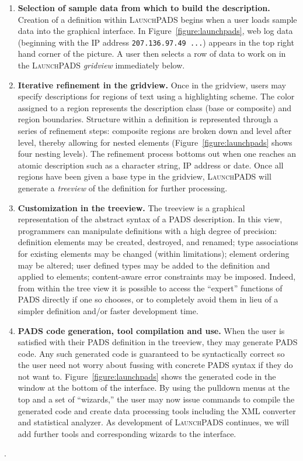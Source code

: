 \documentclass[nocopyrightspace]{sigplanconf}
\begin{document}
\begin{enumerate}
\item {\bf Selection of sample data from which to build the description.} 
Creation of a definition within \textsc{LaunchPADS} begins
when a user loads sample data into the graphical interface.
In Figure~\ref{figure:launchpads}, web log data (beginning with
the IP address {\tt 207.136.97.49 ...}) appears
in the top right hand corner of the picture.  A user then
selects a row of data to work on in the \textsc{LaunchPADS} {\it gridview}
immediately below.

\item {\bf Iterative refinement in the gridview.}
Once in the gridview, users may specify descriptions 
for regions of text using a highlighting scheme.  The 
color assigned to a region
represents the description class (base or composite) and region boundaries.  
Structure within a definition is represented through a series of
refinement steps: composite regions are broken down and level after 
level, thereby allowing for nested elements (Figure~\ref{figure:launchpads}
shows four nesting levels).  The refinement process bottoms out
when one reaches an atomic description such as a character string,
IP address or date.  Once all regions have
been given a base type in the gridview,  \textsc{LaunchPADS} will generate a
{\it treeview} of the definition for further processing.

\item {\bf Customization in the treeview.}  The treeview is
a graphical representation of the abstract syntax of a PADS description.
In this view, programmers can manipulate definitions with a high degree
of precision: definition elements may be created, destroyed, and
renamed; type associations for existing elements may be changed
(within limitations); element ordering may be altered; user defined
types may be added to the definition and applied to elements;
content-aware error constraints may be imposed.  Indeed, from within
the tree view it is possible to access the ``expert'' functions of
\textsc{PADS} directly if one so chooses, or to completely avoid them
in lieu of a simpler definition and/or faster development time.

\item {\bf \textsc{PADS} code generation, tool compilation and use.}  When 
the user is satisfied with their \textsc{PADS} definition in the treeview,
they may generate \textsc{PADS} code.  Any such generated code is guaranteed 
to be syntactically correct so the user need not worry about fussing with
concrete \textsc{PADS} syntax if they do not want to. 
Figure~\ref{figure:launchpads}
shows the generated code in the window at the bottom of the
interface.  By using the pulldown menus at the top and a set of
``wizards,'' the user may now
issue commands to compile the generated code and create data processing
tools including the XML converter and statistical analyzer.  
As development of \textsc{LaunchPADS} continues, we will add further
tools and corresponding wizards to the interface.
\end{enumerate}.
\end{document}
